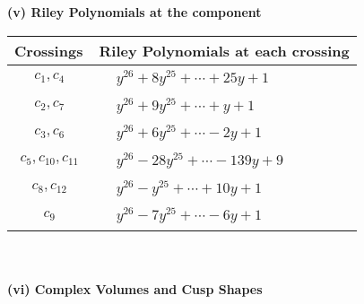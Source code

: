 \documentclass[1p]{elsarticle_modified}
\theoremstyle{definition}
\begin{document}
\newpage\renewcommand{\arraystretch}{1}
\flushleft \textbf{(v) Riley Polynomials at the component}\newline \\
\begin{tabular}{m{50pt}|m{274pt}}
Crossings & \hspace{64pt}Riley Polynomials at each crossing \\
\hline $$\begin{aligned}c_{1},c_{4}\end{aligned}$$&$\begin{aligned}
&y^{26}+8 y^{25}+\cdots+25 y+1
\end{aligned}$\\
\hline $$\begin{aligned}c_{2},c_{7}\end{aligned}$$&$\begin{aligned}
&y^{26}+9 y^{25}+\cdots+y+1
\end{aligned}$\\
\hline $$\begin{aligned}c_{3},c_{6}\end{aligned}$$&$\begin{aligned}
&y^{26}+6 y^{25}+\cdots-2 y+1
\end{aligned}$\\
\hline $$\begin{aligned}c_{5},c_{10},c_{11}\end{aligned}$$&$\begin{aligned}
&y^{26}-28 y^{25}+\cdots-139 y+9
\end{aligned}$\\
\hline $$\begin{aligned}c_{8},c_{12}\end{aligned}$$&$\begin{aligned}
&y^{26}- y^{25}+\cdots+10 y+1
\end{aligned}$\\
\hline $$\begin{aligned}c_{9}\end{aligned}$$&$\begin{aligned}
&y^{26}-7 y^{25}+\cdots-6 y+1
\end{aligned}$\\
\hline
\end{tabular}\\~\\
\newpage\flushleft \textbf{(vi) Complex Volumes and Cusp Shapes}
\end{document}

